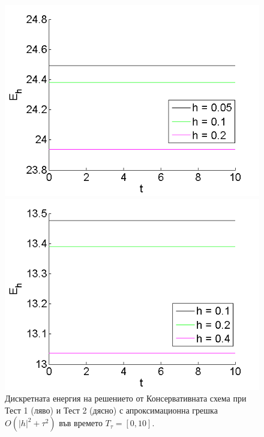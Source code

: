 \documentclass[a4paper]{article}
\theoremstyle{remark}
\begin{document}
\begin{large}
\begin{figure}[ht]\vspace{0.02cm}
	\begin{minipage}[b]{0.48\linewidth}
		\includegraphics[width=\linewidth]{../amitans/figures/Energy_EnergySave_bt3_c045_x3O.png}	
	\end{minipage}
	\begin{minipage}[b]{0.48\linewidth}
		 \includegraphics[width=\linewidth]{../amitans/figures/Energy_EnergySave_bt1_c090_x3O.png}
	\end{minipage}
\caption{Дискретната енергия на решението от Консервативната схема при Тест 1 (ляво) и Тест 2 (дясно) с апроксимационна грешка $O(|h|^2 + \tau^2)$ във времето $T_{\tau} = [0, 10]$.}

\end{figure}
\end{large}
\end{document}
